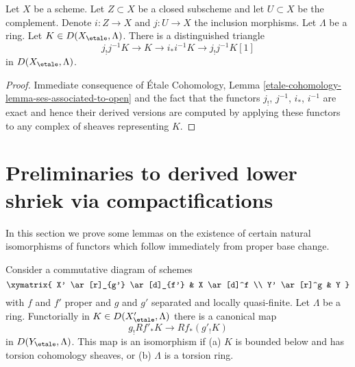 \begin{lemma}
\label{lemma-triangle-associated-to-open}
Let $X$ be a scheme. Let $Z \subset X$ be a closed subscheme and let
$U \subset X$ be the complement. Denote $i : Z \to X$ and $j : U \to X$
the inclusion morphisms. Let $\Lambda$ be a ring.
Let $K \in D(X_\etale, \Lambda)$. There is a distinguished triangle
$$
j_!j^{-1}K \to K \to i_*i^{-1}K \to j_!j^{-1}K[1]
$$
in $D(X_\etale, \Lambda)$.
\end{lemma}

\begin{proof}
Immediate consequence of \'Etale Cohomology, Lemma
\ref{etale-cohomology-lemma-ses-associated-to-open}
and the fact that the functors $j_!$, $j^{-1}$, $i_*$, $i^{-1}$
are exact and hence their derived versions are computed by
applying these functors to any complex of sheaves representing $K$.
\end{proof}





\section{Preliminaries to derived lower shriek via compactifications}
\label{section-prelim}

\noindent
In this section we prove some lemmas on the existence of
certain natural isomorphisms of functors which follow immediately
from proper base change.

\begin{lemma}
\label{lemma-shriek-proper-and-open}
Consider a commutative diagram of schemes
$$
\xymatrix{
X' \ar[r]_{g'} \ar[d]_{f'} & X \ar[d]^f \\
Y' \ar[r]^g & Y
}
$$
with $f$ and $f'$ proper and $g$ and $g'$ separated and locally quasi-finite.
Let $\Lambda$ be a ring. Functorially in $K \in D(X'_\etale, \Lambda)$
there is a canonical map
$$
g_!Rf'_*K \longrightarrow Rf_*(g'_!K)
$$
in $D(Y_\etale, \Lambda)$. This map is an isomorphism if
(a) $K$ is bounded below and has torsion cohomology sheaves, or
(b) $\Lambda$ is a torsion ring.
\end{lemma}

